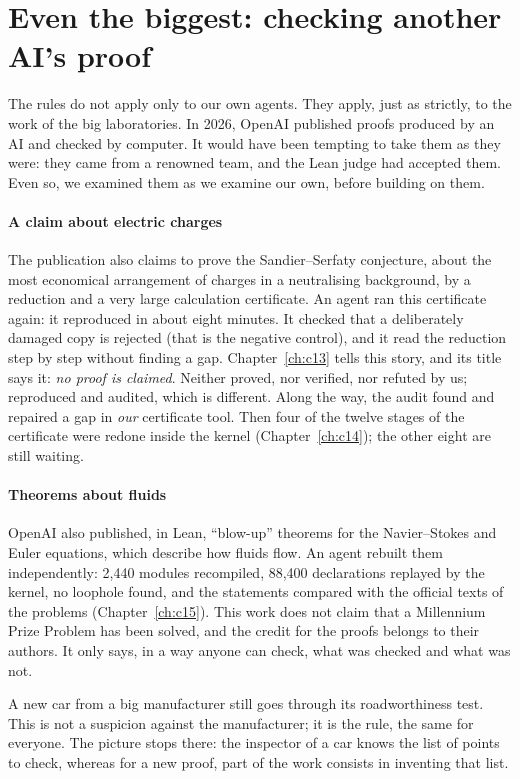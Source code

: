 \section{Even the biggest: checking another AI's proof}

The rules do not apply only to our own agents. They apply, just as strictly, to the work of the big laboratories. In
2026, OpenAI published proofs produced by an AI and checked by computer. It would have been tempting to take
them as they were: they came from a renowned team, and the Lean judge had accepted them. Even so, we examined them as
we examine our own, before building on them.

\paragraph{A claim about electric charges} The publication also claims to prove the Sandier--Serfaty conjecture, about
the most economical arrangement of charges in a neutralising background, by a reduction and a very large calculation
certificate. An agent ran this certificate again: it reproduced in about eight minutes. It checked that a deliberately
damaged copy is rejected (that is the negative control), and it read the reduction step by step without finding a
gap. Chapter~\ref{ch:c13} tells this story, and its title says it: \emph{no proof is claimed}. Neither proved, nor
verified, nor refuted by us; reproduced and audited, which is different. Along the way, the audit found and repaired a
gap in \emph{our} certificate tool. Then four of the twelve stages of the certificate were redone inside the kernel
(Chapter~\ref{ch:c14}); the other eight are still waiting.

\paragraph{Theorems about fluids} OpenAI also published, in Lean, ``blow-up'' theorems for the Navier--Stokes and Euler
equations, which describe how fluids flow. An agent rebuilt them independently: 2,440 modules recompiled, 88,400
declarations replayed by the kernel, no loophole found, and the statements compared with the official texts of the
problems (Chapter~\ref{ch:c15}). This work does not claim that a Millennium Prize Problem has been solved, and the
credit for the proofs belongs to their authors. It only says, in a way anyone can check, what was checked and what
was not.

\begin{analogie}
A new car from a big manufacturer still goes through its roadworthiness test. This is not a suspicion against the
manufacturer; it is the rule, the same for everyone. The picture stops there: the inspector of a car knows the list
of points to check, whereas for a new proof, part of the work consists in inventing that list.
\end{analogie}

